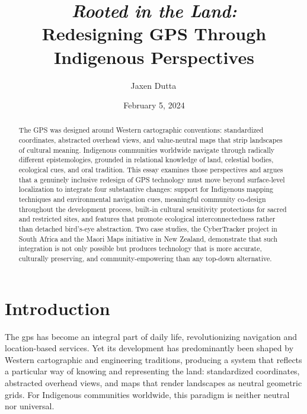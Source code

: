 \documentclass[11pt,showkeys]{essay}
\begin{document}
\title{\textit{Rooted in the Land:}\\
Redesigning GPS Through Indigenous Perspectives}

\author{Jaxen Dutta\, }

\date{February 5, 2024}

\begin{abstract}
The GPS was designed around Western cartographic conventions: standardized coordinates, abstracted overhead views, and value-neutral maps that strip landscapes of cultural meaning. Indigenous communities worldwide navigate through radically different epistemologies, grounded in relational knowledge of land, celestial bodies, ecological cues, and oral tradition. This essay examines those perspectives and argues that a genuinely inclusive redesign of GPS technology must move beyond surface-level localization to integrate four substantive changes: support for Indigenous mapping techniques and environmental navigation cues, meaningful community co-design throughout the development process, built-in cultural sensitivity protections for sacred and restricted sites, and features that promote ecological interconnectedness rather than detached bird's-eye abstraction. Two case studies, the CyberTracker project in South Africa and the Maori Maps initiative in New Zealand, demonstrate that such integration is not only possible but produces technology that is more accurate, culturally preserving, and community-empowering than any top-down alternative.
\end{abstract}


\maketitle

\section{Introduction}

The \gls{gps} has become an integral part of daily life, revolutionizing navigation and location-based services. Yet its development has predominantly been shaped by Western cartographic and engineering traditions, producing a system that reflects a particular way of knowing and representing the land: standardized coordinates, abstracted overhead views, and maps that render landscapes as neutral geometric grids. For Indigenous communities worldwide, this paradigm is neither neutral nor universal.
\end{document}
